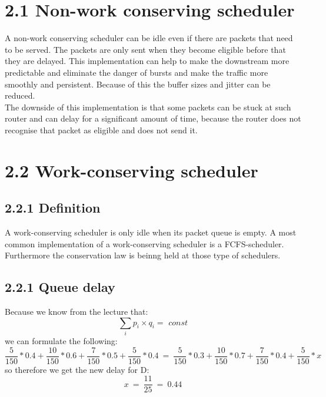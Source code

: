 \documentclass{article}
\begin{document}
	\pagestyle{fancy}
	\hfill
	
	\section*{2.1 Non-work conserving scheduler}
	\begin{adjustwidth}{2em}{2em} 
		A non-work conserving scheduler can be idle even if there are packets that need to be served. The packets are only sent when they become eligible before that they are delayed. This implementation can help to make the downstream more predictable and eliminate the danger of bursts and make the traffic more smoothly and persistent. Because of this the buffer sizes and jitter can be reduced. \\
		The downside of this implementation is that some packets can be stuck at such router and can delay for a significant amount of time, because the router does not recognise that packet as eligible and does not send it.
	\end{adjustwidth}
	
	\section*{2.2 Work-conserving scheduler}
	\begin{adjustwidth}{2em}{2em}
		\subsection*{2.2.1 Definition}
		\begin{adjustwidth}{2em}{2em}
			A work-conserving scheduler is only idle when its packet queue is empty. A most common implementation of a work-conserving scheduler is a FCFS-scheduler. Furthermore the conservation law is beinng held at those type of schedulers.
		\end{adjustwidth}
		\subsection*{2.2.1 Queue delay}
		\begin{adjustwidth}{2em}{2em}
			Because we know from the lecture that: \\
			\[
				\sum_i p_i \times q_i = \textit{ const}
			\]
			we can formulate the following:
			\[
				\frac{5}{150} * 0.4 + \frac{10}{150} * 0.6 + \frac{7}{150} * 0.5 + \frac{5}{150} * 0.4 \ = \ \frac{5}{150} * 0.3 + \frac{10}{150} * 0.7 + \frac{7}{150} * 0.4 + \frac{5}{150} * x
			\]
			so therefore we get the new delay for D:
			\[
				x \ = \ \frac{11}{25} \ = \ 0.44
			\]
		\end{adjustwidth}
	\end{adjustwidth}
	
\end{document}
